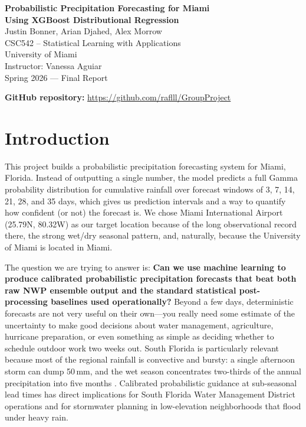 \documentclass[11pt]{article}
\begin{document}
\begin{center}
    {\LARGE \textbf{Probabilistic Precipitation Forecasting for Miami\\Using XGBoost Distributional Regression}}\\[1.5em]
    {\large Justin Bonner, Arian Djahed, Alex Morrow}\\[0.5em]
    CSC542 -- Statistical Learning with Applications\\
    University of Miami\\
    Instructor: Vanessa Aguiar\\[0.5em]
    Spring 2026 --- Final Report
\end{center}
\vspace{0.5em}

\begin{center}
\textbf{GitHub repository:} \url{https://github.com/raflll/GroupProject}
\end{center}
\vspace{1em}

\section{Introduction}

This project builds a probabilistic precipitation forecasting system for Miami, Florida. Instead of outputting a single number, the model predicts a full Gamma probability distribution for cumulative rainfall over forecast windows of 3, 7, 14, 21, 28, and 35 days, which gives us prediction intervals and a way to quantify how confident (or not) the forecast is. We chose Miami International Airport (25.79\textdegree N, 80.32\textdegree W) as our target location because of the long observational record there, the strong wet/dry seasonal pattern, and, naturally, because the University of Miami is located in Miami.

The question we are trying to answer is: \textbf{Can we use machine learning to produce calibrated probabilistic precipitation forecasts that beat both raw NWP ensemble output and the standard statistical post-processing baselines used operationally?} Beyond a few days, deterministic forecasts are not very useful on their own---you really need some estimate of the uncertainty to make good decisions about water management, agriculture, hurricane preparation, or even something as simple as deciding whether to schedule outdoor work two weeks out. South Florida is particularly relevant because most of the regional rainfall is convective and bursty: a single afternoon storm can dump 50\,mm, and the wet season concentrates two-thirds of the annual precipitation into five months \citep{misra2011}. Calibrated probabilistic guidance at sub-seasonal lead times has direct implications for South Florida Water Management District operations and for stormwater planning in low-elevation neighborhoods that flood under heavy rain.
\end{document}
